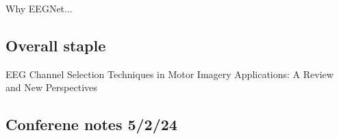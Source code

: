 \documentclass{Configuration_Files/PoliMi3i_thesis}
\begin{document}
Why EEGNet...

\subsection{Overall staple}
{EEG Channel Selection Techniques in Motor Imagery Applications: A Review and New Perspectives}

\subsection{Conferene notes 5/2/24}



\end{document}
